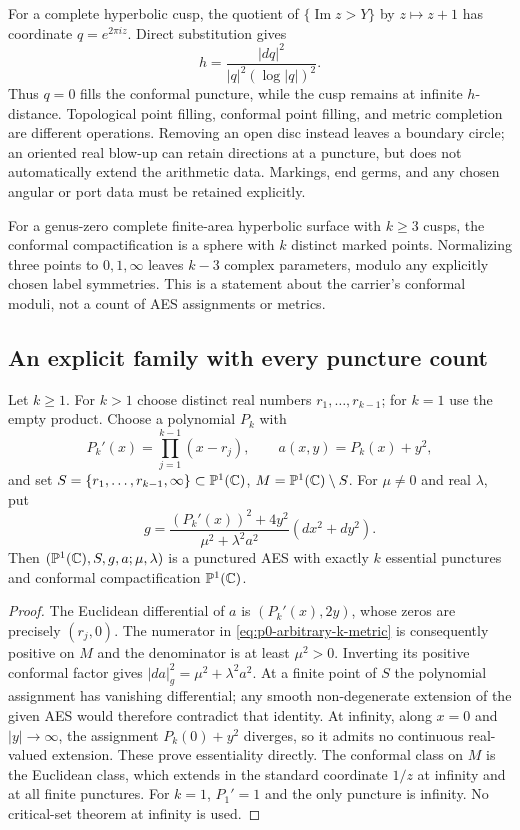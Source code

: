 For a complete hyperbolic cusp, the quotient of $\{\operatorname{Im}z>Y\}$
by $z\mapsto z+1$ has coordinate $q=e^{2\pi iz}$.  Direct substitution gives
\[
 h=\frac{|dq|^2}{|q|^2(\log|q|)^2}.
\]
Thus $q=0$ fills the conformal puncture, while the cusp remains at infinite
$h$-distance.  Topological point filling, conformal point filling, and metric
completion are different operations.  Removing an open disc instead leaves a
boundary circle; an oriented real blow-up can retain directions at a puncture,
but does not automatically extend the arithmetic data.  Markings, end germs,
and any chosen angular or port data must be retained explicitly.

For a genus-zero complete finite-area hyperbolic surface with $k\ge3$ cusps,
the conformal compactification is a sphere with $k$ distinct marked points.
Normalizing three points to $0,1,\infty$ leaves $k-3$ complex parameters,
modulo any explicitly chosen label symmetries.  This is a statement about the
carrier's conformal moduli, not a count of AES assignments or metrics.

\subsection{An explicit family with every puncture count}

\begin{theorem}
\label{thm:p0-arbitrary-k-punctures}
Let $k\ge1$.  For $k>1$ choose distinct real numbers $r_1,\ldots,r_{k-1}$;
for $k=1$ use the empty product.  Choose a polynomial $P_k$ with
\[
 P_k'(x)=\prod_{j=1}^{k-1}(x-r_j),\qquad
 a(x,y)=P_k(x)+y^2,
\]
and set $S=\{r_1,\ldots,r_{k-1},\infty\}\subset\mathbb{P}^1(\mathbb{C})$,
$M=\mathbb{P}^1(\mathbb{C})\setminus S$.  For $\mu\ne0$ and real $\lambda$, put
\begin{equation}
 g=\frac{(P_k'(x))^2+4y^2}{\mu^2+\lambda^2a^2}(dx^2+dy^2).
 \label{eq:p0-arbitrary-k-metric}
\end{equation}
Then $(\mathbb{P}^1(\mathbb{C}),S,g,a;\mu,\lambda)$ is a punctured AES with exactly
$k$ essential punctures and conformal compactification $\mathbb{P}^1(\mathbb{C})$.
\end{theorem}

\begin{proof}
The Euclidean differential of $a$ is $(P_k'(x),2y)$, whose zeros are precisely
$(r_j,0)$.  The numerator in \eqref{eq:p0-arbitrary-k-metric} is consequently
positive on $M$ and the denominator is at least $\mu^2>0$.  Inverting its
positive conformal factor gives $|da|_g^2=\mu^2+\lambda^2a^2$.
At a finite point of $S$ the polynomial assignment has vanishing differential;
any smooth non-degenerate extension of the given AES would therefore contradict
that identity.  At infinity, along $x=0$ and $|y|\to\infty$, the assignment
$P_k(0)+y^2$ diverges, so it admits no continuous real-valued extension.
These prove essentiality directly.  The conformal class on $M$ is the
Euclidean class, which extends in the standard coordinate $1/z$ at infinity
and at all finite punctures.  For $k=1$, $P_1'=1$ and the only puncture is
infinity.  No critical-set theorem at infinity is used.
\end{proof}

